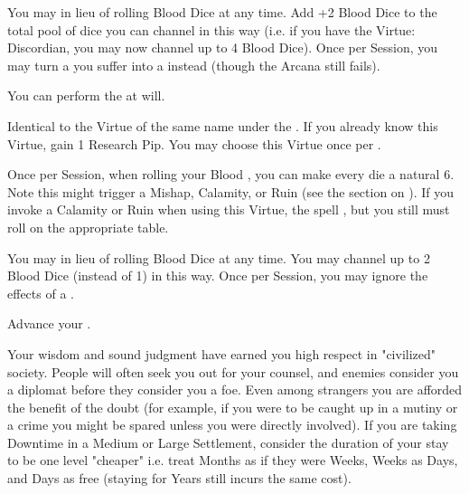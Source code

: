 \begin{multicols*}{2}



You may  in lieu of rolling Blood Dice at any time. Add +2 Blood Dice to the total pool of dice you can channel in this way (i.e. if you have the Virtue: Discordian, you may now channel up to 4 Blood Dice). Once per Session, you may turn a  you suffer into a  instead (though the Arcana still fails).


You can perform the  at will.


Identical to the Virtue of the same name under the . If you already know this Virtue, gain 1 Research Pip. You may choose this Virtue once per \LVL.


\newpage


Once per Session, when rolling your Blood \POOL, you can make every die a natural 6.  Note this might trigger a Mishap, Calamity, or Ruin (see the section on ).  If you invoke a Calamity or Ruin when using this Virtue, the spell , but you still must roll on the appropriate table.


   You may  in lieu of rolling Blood Dice at any time. You may channel up to 2 Blood Dice (instead of 1) in this way. Once per Session, you may ignore the effects of a .



Advance your \INGENUITY \DCUP. 


Your wisdom and sound judgment have earned you high respect in "civilized" society. People will often seek you out for your counsel, and enemies consider you a diplomat before they consider you a foe. Even among strangers you are afforded the benefit of the doubt (for example, if you were to be caught up in a mutiny or a crime you might be spared unless you were directly involved). If you are taking Downtime in a Medium or Large Settlement, consider the duration of your stay to be one level "cheaper" i.e. treat Months as if they were Weeks, Weeks as Days, and Days as free (staying for Years still incurs the same cost).


\end{multicols*}
